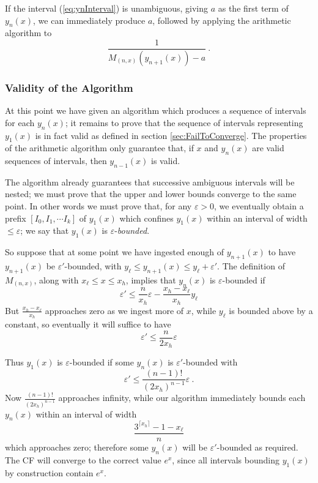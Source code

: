 \documentclass[11pt, oneside]{amsart}   	%
\renewcommand{\:}{\negthickspace:\negthickspace}
\begin{document}
If the interval (\ref{eq:ynInterval}) is unambiguous, giving $a$ as the first term of $y_n(x)$, we can immediately produce $a$, followed by applying the arithmetic algorithm to
\[
\frac{1}{M_{(n,x)}(y_{n+1}(x)) - a} \ .
\]

\subsubsection{Validity of the Algorithm}\label{sec:validity} At this point we have given an algorithm which produces a sequence of intervals for each $y_n(x)$; it remains to prove that the sequence of intervals representing $y_1(x)$ is in fact valid as defined in section \ref{sec:FailToConverge}.
The properties of the arithmetic algorithm only guarantee that, if $x$ and $y_n(x)$ are valid sequences of intervals, then $y_{n-1}(x)$ is valid.

The algorithm already guarantees that successive ambiguous intervals will be nested; we must prove that the upper and lower bounds converge to the same point. In other words we must prove that, for any $\varepsilon > 0$, we eventually obtain a prefix $[I_0, I_1,\cdots I_k]$ of  $y_1(x)$ which confines  $y_1(x)$ within an interval of width $\leq \varepsilon$; we say that $y_1(x)$ is $\varepsilon$-\emph{bounded}.

So suppose that at some point we have ingested enough of  $y_{n+1}(x)$ to have $y_{n+1}(x)$ be $\varepsilon'$-bounded, with $y_\ell \leq y_{n+1}(x) \leq y_\ell + \varepsilon'$. The definition of $M_{(n,x)}$, along with $x_{\ell} \leq x \leq x_{h}$,  implies that  $y_n(x)$ is $\varepsilon$-bounded if
\[
\varepsilon' \leq \frac{n}{x_h}\varepsilon - \frac{x_h - x_\ell}{x_h}y_\ell
\]
But $\frac{x_h - x_\ell}{x_h}$ approaches zero as we ingest more of $x$, while $y_\ell$ is bounded above by a constant, so eventually it will suffice to have
\[
\varepsilon' \leq \frac{n}{2x_h}\varepsilon
\]

Thus $y_1(x)$ is $\varepsilon$-bounded if some $y_n(x)$ is $\varepsilon'$-bounded with
\[
\varepsilon' \leq \frac{(n-1)!}{(2x_h)^{n-1}}\varepsilon \ .
\]
Now $\frac{(n-1)!}{(2x_h)^{n-1}}$ approaches infinity, while our algorithm immediately bounds each $y_n(x)$ within an interval of width
\[
 \frac{3^{\lceil x_{h}\rceil}-1 - x_{\ell}}{n}
\]
which approaches zero; therefore some $y_n(x)$ will be $\varepsilon'$-bounded as required. The CF will converge to the correct value $e^x$, since all intervals bounding $y_1(x)$ by construction contain $e^x$.

\end{document}
